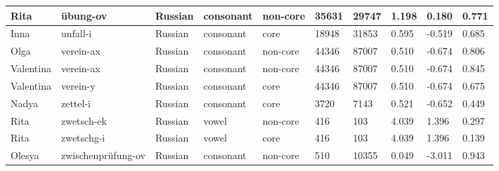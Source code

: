 \begin{longtable}{|p{1.2cm}|p{3cm}|p{1cm}|p{1.5cm}|p{1.5cm}|R{1.2cm}|R{1cm}|R{1cm}|R{0.8cm}|R{0.8cm}|}
Rita      & \"{u}bung-ov           & Russian       & consonant        & non-core  & 35631        & 29747          & 1.198                 & 0.180             & 0.771        \\ \hline
Inna      & unfall-i               & Russian       & consonant        & core      & 18948        & 31853          & 0.595                 & -0.519            & 0.685        \\ \hline
Olga      & verein-ax              & Russian       & consonant        & non-core  & 44346        & 87007          & 0.510                 & -0.674            & 0.806        \\ \hline
Valentina & verein-ax              & Russian       & consonant        & non-core  & 44346        & 87007          & 0.510                 & -0.674            & 0.845        \\ \hline
Valentina & verein-y               & Russian       & consonant        & core      & 44346        & 87007          & 0.510                 & -0.674            & 0.675        \\ \hline
Nadya     & zettel-i               & Russian       & consonant        & core      & 3720         & 7143           & 0.521                 & -0.652            & 0.449        \\ \hline
Rita      & zwetsch-ek             & Russian       & vowel            & non-core  & 416          & 103            & 4.039                 & 1.396             & 0.297        \\ \hline
Rita      & zwetschg-i             & Russian       & vowel            & core      & 416          & 103            & 4.039                 & 1.396             & 0.139        \\ \hline
Olesya    & zwischenpr\"{u}fung-ov & Russian       & consonant        & non-core  & 510          & 10355          & 0.049                 & -3.011            & 0.943        \\ \hline


\end{longtable}

\normalsize %